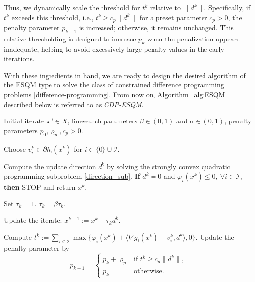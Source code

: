 \documentclass[11pt,a4paper]{article}
\theoremstyle{plain}
\begin{document}
Thus, we dynamically scale the threshold for $t^k$ relative to $\|d^k\|$. Specifically, if $t^{k}$ exceeds this threshold, i.e., $t^k \ge c_p \|d^k\|$ for a preset parameter $c_p > 0$, the penalty parameter $p_{k+1}$ is increased; otherwise, it remains unchanged. This relative thresholding is designed to increase $p_k$ when the penalization appears inadequate, helping to avoid excessively large penalty values in the early iterations.



With these ingredients in hand, we are ready to design the desired algorithm of the ESQM type to solve the class of constrained difference programming problems \eqref{difference-programming}. From now on, Algorithm~\ref{alg:ESQM} described below is referred to as {\em CDP-ESQM}.


\begin{algorithm}
\caption{ESQM for Solving Constrained Difference Programming (CDP-ESQM)}
\label{alg:ESQM}
\begin{algorithmic}[1]
\Require Initial iterate \( x^0 \in X \), linesearch parameters \( \beta \in (0,1) \) and \( \sigma \in (0,1) \),  penalty parameters  \( p_0, \varrho_p, c_p > 0 \).



\State Choose $v_i^k \in \partial h_i(x^k)$ for $i \in \{0\} \cup \mathcal{I}$.

\State Compute the update direction \( d^k \) by solving the strongly convex quadratic programming  subproblem \eqref{direction_sub}. 
\State \textbf{If} $d^k = 0$ and $\varphi_i(x^k) \le 0, \ \forall i \in \mathcal{I}$, \textbf{then} STOP and return $x^k$.


    
\State Set $\tau_k = 1$. 
{$ \tau_k = \beta \tau_k$. }
\EndWhile

\State  Update the iterate: \( x^{k+1} := x^k + \tau_k d^k \).

\State Compute $t^k := \sum_{i\in\mathcal{I}} \max \{ \varphi_i(x^k) + \langle \nabla g_i(x^k) - v_i^k, d^k \rangle, 0 \}.$
\State Update the penalty parameter by
\[
p_{k+1} =
\begin{cases}
p_k + \varrho_p & \text{if } t^k \geq c_p \| d^k \|, \\
p_k & \text{otherwise.}
\end{cases}
\]

\EndFor
\end{algorithmic}
\end{algorithm}
\end{document}

